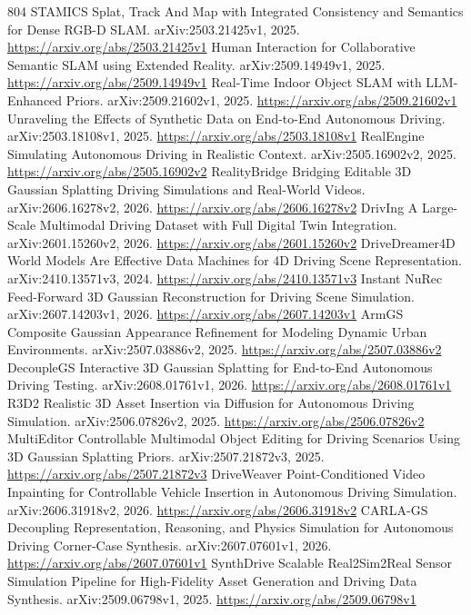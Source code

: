 \documentclass[11pt]{article}
\begin{document}
\begin{thebibliography}{804}
 STAMICS Splat, Track And Map with Integrated Consistency and Semantics for Dense RGB-D SLAM. arXiv:2503.21425v1, 2025. \url{https://arxiv.org/abs/2503.21425v1}
 Human Interaction for Collaborative Semantic SLAM using Extended Reality. arXiv:2509.14949v1, 2025. \url{https://arxiv.org/abs/2509.14949v1}
 Real-Time Indoor Object SLAM with LLM-Enhanced Priors. arXiv:2509.21602v1, 2025. \url{https://arxiv.org/abs/2509.21602v1}
 Unraveling the Effects of Synthetic Data on End-to-End Autonomous Driving. arXiv:2503.18108v1, 2025. \url{https://arxiv.org/abs/2503.18108v1}
 RealEngine Simulating Autonomous Driving in Realistic Context. arXiv:2505.16902v2, 2025. \url{https://arxiv.org/abs/2505.16902v2}
 RealityBridge Bridging Editable 3D Gaussian Splatting Driving Simulations and Real-World Videos. arXiv:2606.16278v2, 2026. \url{https://arxiv.org/abs/2606.16278v2}
 DrivIng A Large-Scale Multimodal Driving Dataset with Full Digital Twin Integration. arXiv:2601.15260v2, 2026. \url{https://arxiv.org/abs/2601.15260v2}
 DriveDreamer4D World Models Are Effective Data Machines for 4D Driving Scene Representation. arXiv:2410.13571v3, 2024. \url{https://arxiv.org/abs/2410.13571v3}
 Instant NuRec Feed-Forward 3D Gaussian Reconstruction for Driving Scene Simulation. arXiv:2607.14203v1, 2026. \url{https://arxiv.org/abs/2607.14203v1}
 ArmGS Composite Gaussian Appearance Refinement for Modeling Dynamic Urban Environments. arXiv:2507.03886v2, 2025. \url{https://arxiv.org/abs/2507.03886v2}
 DecoupleGS Interactive 3D Gaussian Splatting for End-to-End Autonomous Driving Testing. arXiv:2608.01761v1, 2026. \url{https://arxiv.org/abs/2608.01761v1}
 R3D2 Realistic 3D Asset Insertion via Diffusion for Autonomous Driving Simulation. arXiv:2506.07826v2, 2025. \url{https://arxiv.org/abs/2506.07826v2}
 MultiEditor Controllable Multimodal Object Editing for Driving Scenarios Using 3D Gaussian Splatting Priors. arXiv:2507.21872v3, 2025. \url{https://arxiv.org/abs/2507.21872v3}
 DriveWeaver Point-Conditioned Video Inpainting for Controllable Vehicle Insertion in Autonomous Driving Simulation. arXiv:2606.31918v2, 2026. \url{https://arxiv.org/abs/2606.31918v2}
 CARLA-GS Decoupling Representation, Reasoning, and Physics Simulation for Autonomous Driving Corner-Case Synthesis. arXiv:2607.07601v1, 2026. \url{https://arxiv.org/abs/2607.07601v1}
 SynthDrive Scalable Real2Sim2Real Sensor Simulation Pipeline for High-Fidelity Asset Generation and Driving Data Synthesis. arXiv:2509.06798v1, 2025. \url{https://arxiv.org/abs/2509.06798v1}

\end{thebibliography}
\end{document}
